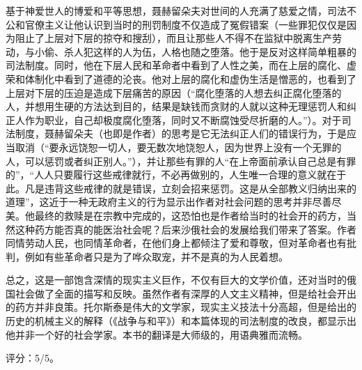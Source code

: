 基于神爱世人的博爱和平等思想，聂赫留朵夫对世间的人充满了慈爱之情，司法不公和官僚主义让他认识到当时的刑罚制度不仅造成了冤假错案（一些罪犯仅仅是因为阻止了上层对下层的掠夺和搜刮），而且让那些人不得不在监狱中脱离生产劳动，与小偷、杀人犯这样的人为伍，人格也随之堕落。他于是反对这样简单粗暴的司法制度。同时，他在下层人民和革命者中看到了人性之美，而在上层的腐化、虚荣和体制化中看到了道德的沦丧。他对上层的腐化和虚伪生活是憎恶的，也看到了上层对下层的压迫是造成下层痛苦的原因（“腐化堕落的人想去纠正腐化堕落的人，并想用生硬的方法达到目的，结果是缺钱而贪财的人就以这种无理惩罚人和纠正人作为职业，自己却极度腐化堕落，同时又不断腐蚀受尽折磨的人。”）。对于司法制度，聂赫留朵夫（也即是作者）的思考是它无法纠正人们的错误行为，于是应当取消（“要永远饶恕一切人，要无数次地饶恕人，因为世界上没有一个无罪的人，可以惩罚或者纠正别人。”），并让那些有罪的人“在上帝面前承认自己总是有罪的”，“人人只要履行这些戒律就行，不必再做别的，人生唯一合理的意义就在于此。凡是违背这些戒律的就是错误，立刻会招来惩罚。这是从全部教义归纳出来的道理”，这近于一种无政府主义的行为显示出作者对社会问题的思考并非尽善尽美。他最终的救赎是在宗教中完成的，这恐怕也是作者给当时的社会开的药方，当然这种药方能否真的能医治社会呢？后来沙俄社会的发展给我们带来了答案。作者同情劳动人民，也同情革命者，在他们身上都倾注了爱和尊敬，但对革命者也有批判，例如有些革命者只是为了哗众取宠，并不是真的为人民着想。

总之，这是一部饱含深情的现实主义巨作，不仅有巨大的文学价值，还对当时的俄国社会做了全面的描写和反映。虽然作者有深厚的人文主义精神，但是给社会开出的药方并非良策。托尔斯泰是伟大的文学家，现实主义技法十分高超，但是给出的历史的机械主义的解释（《战争与和平》）和本篇体现的司法制度的改良，都显示出他并非一个好的社会学家。本书的翻译是大师级的，用语典雅而流畅。

评分：5/5。